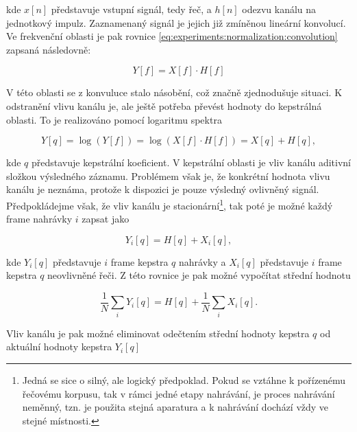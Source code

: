 \noindent kde $x\left[n\right]$ představuje vstupní signál, tedy řeč, a $h\left[n\right]$ odezvu kanálu na jednotkový impulz. Zaznamenaný signál je jejich již zmíněnou lineární konvolucí. Ve frekvenční oblasti je pak rovnice \ref{eq:experiments:normalization:convolution} zapsaná následovně:

\begin{equation}
  Y\left[f\right] = X\left[f\right] \cdot H\left[f\right]
\end{equation}

\noindent V této oblasti se z konvuluce stalo násobění, což značně zjednodušuje situaci. K odstranění vlivu kanálu je, ale ještě potřeba převést hodnoty do kepstrálná oblasti. To je realizováno pomocí logaritmu spektra

\begin{equation}
  Y\left[q\right] = \log\left(Y\left[f\right]\right) = \log\left(X\left[f\right] \cdot H\left[f\right]\right) = X\left[q\right] + H\left[q\right],
\end{equation}

\noindent kde $q$ představuje kepstrální koeficient. V kepstrální oblasti je vliv kanálu aditivní složkou výsledného záznamu. Problémem však je, že konkrétní hodnota vlivu kanálu je neznáma, protože k dispozici je pouze výsledný ovlivněný signál. Předpokládejme však, že vliv kanálu je stacionární\footnote{Jedná se sice o silný, ale logický předpoklad. Pokud se vztáhne k pořízenému řečovému korpusu, tak v rámci jedné etapy nahrávání, je proces nahrávání neměnný, tzn. je použita stejná aparatura a k nahrávání dochází vždy ve stejné místnosti.}, tak poté je možné každý frame nahrávky $i$ zapsat jako

\begin{equation}
  Y_i\left[q\right] = H\left[q\right] + X_i\left[q\right],
\end{equation}

\noindent kde $Y_i\left[q\right]$ představuje $i$ frame kepstra $q$ nahrávky a $X_i\left[q\right]$ představuje $i$ frame kepstra $q$ neovlivněné řeči. Z této rovnice je pak možné vypočítat střední hodnotu

\begin{equation}
  \frac{1}{N} \sum_i Y_i\left[q\right] = H\left[q\right] + \frac{1}{N} \sum_i X_i\left[q\right].
\end{equation}

\noindent Vliv kanálu je pak možné eliminovat odečtením střední hodnoty kepstra $q$ od aktuální hodnoty kepstra $Y_i\left[q\right]$

